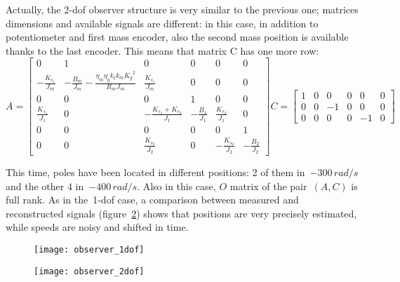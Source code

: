 Actually, the \acrshort{2-dof} observer structure is very similar to the previous one; matrices dimensions and available signals are different: in this case, in addition to potentiometer and first mass encoder, also the second mass position is available thanks to the last encoder. This means that matrix C has one more row:
\begin{equation}
	A = 
	\begin{bmatrix}
		0 &1 & 0 & 0 & 0 & 0 \\
		-\frac{K_{s_1}}{J_m} & -\frac{B_m}{J_m}-\frac{\eta_m \eta_g k_t k_m {K_g}^2}{R_m J_m}  & \frac{K_{s_1}}{J_m} & 0 & 0 & 0 \\
		0 & 0 & 0 & 1 & 0 & 0 \\
		\frac{K_{s_1}}{J_1} & 0 & -\frac{K_{s_1}+K_{s_2}}{J_1} & -\frac{B_1}{J_1} & \frac{K_{s_2}}{J_1} & 0 \\
		0 & 0 & 0 & 0 & 0 & 1 \\
		0 & 0 & \frac{K_{s_2}}{J_2} & 0 & -\frac{K_{s_2}}{J_2} & -\frac{B_2}{J_2}
	\end{bmatrix}
	C =
	\begin{bmatrix}
		1 & 0 & 0 & 0 & 0 & 0 \\
		0 & 0 & -1 & 0 & 0 & 0  \\
		0 & 0 & 0 & 0 & -1 & 0
	\end{bmatrix}
\end{equation}

This time, poles have been located in different positions: 2 of them in~$-300 \, rad/s$ and the other 4 in~$-400 \, rad/s$. Also in this case, $\mathit{O}$ matrix of the pair~$(A,C)$ is full rank. As in the~\acrshort{1-dof} case, a comparison between measured and reconstructed signals (figure~\ref{fig:observer_2dof}) shows that positions are very precisely estimated, while speeds are noisy and shifted in time.

\begin{figure*}
	\centering
	\begin{subfigure}{0.45\columnwidth}
		\texttt{[image: observer\_1dof]}
		\label{fig:observer_1dof}
	\end{subfigure}
	\begin{subfigure}{0.45\columnwidth}
		\texttt{[image: observer\_2dof]}
		\label{fig:observer_2dof}
	\end{subfigure}
	\caption{Observer reconstruction compared to available measurements}
\end{figure*}
